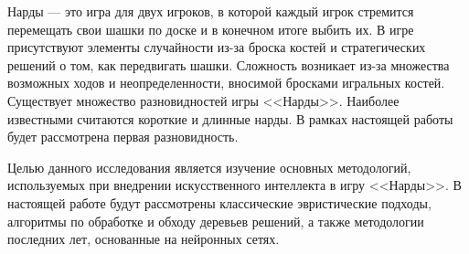 Нарды --- это игра для двух игроков, в которой каждый игрок стремится перемещать свои шашки по доске и в конечном итоге выбить их. В игре присутствуют элементы случайности из-за броска костей и стратегических решений о том, как передвигать шашки. Сложность возникает из-за множества возможных ходов и неопределенности, вносимой бросками игральных костей. Существует множество разновидностей игры <<Нарды>>. Наиболее известными считаются короткие и длинные нарды. В рамках настоящей работы будет рассмотрена первая разновидность.

Целью данного исследования является изучение основных методологий, используемых при внедрении искусственного интеллекта в игру <<Нарды>>. В настоящей работе будут рассмотрены классические эвристические подходы, алгоритмы по обработке и обходу деревьев решений, а также методологии последних лет, основанные на нейронных сетях.
